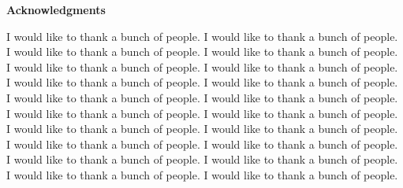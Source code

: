 \MyDoubleSpacing
\begin{center}
  {\large\textbf{Acknowledgments}} 
\end{center}

\noindent \normalsize I would like to thank a bunch of people. I would like to
thank a bunch of people. I would like to thank a bunch of people. I would like
to thank a bunch of people. I would like to thank a bunch of people. I would
like to thank a bunch of people. I would like to thank a bunch of people. I
would like to thank a bunch of people. I would like to thank a bunch of people.
I would like to thank a bunch of people. I would like to thank a bunch of
people. I would like to thank a bunch of people. I would like to thank a bunch
of people. I would like to thank a bunch of people. I would like to thank a
bunch of people. I would like to thank a bunch of people. I would like to thank
a bunch of people. I would like to thank a bunch of people. I would like to
thank a bunch of people. I would like to thank a bunch of people.

\clearpage